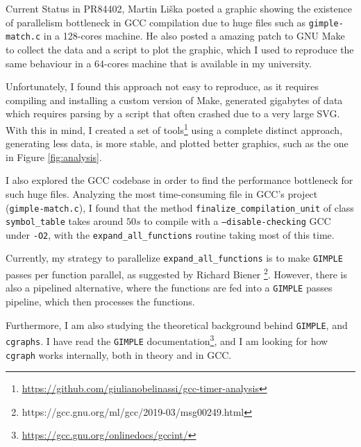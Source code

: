 \documentclass[12pt]{article}
\begin{document}
\begin{subsection}{Current Status}
in PR84402, Martin Liška posted a graphic showing the existence of
parallelism bottleneck in GCC compilation due to huge files such as
\texttt{gimple-match.c} in a 128-cores machine. He also posted a amazing patch to
GNU Make to collect the data and a script to plot the graphic, which I used
to reproduce the same behaviour in a 64-cores machine that is available in
my university.

Unfortunately, I found this approach not easy to reproduce, as
it requires compiling and installing a custom version of Make, generated
gigabytes of data which requires parsing by a script that often crashed due
to a very large SVG. With this in mind, I created a set of
tools\footnote{\url{https://github.com/giulianobelinassi/gcc-timer-analysis}}
using a complete distinct approach, generating less data, is more stable, and
plotted better graphics, such as the one in Figure \ref{fig:analysis}.

I also explored the GCC codebase in order to find the performance bottleneck for
such huge files. Analyzing the most time-consuming file in GCC's project
(\texttt{gimple-match.c}), I found that the method
\texttt{finalize\_compilation\_unit} of
class \texttt{symbol\_table} takes around $50s$ to compile with a
\texttt{--disable-checking} GCC under \texttt{-O2}, with the \texttt{expand\_all\_functions}
routine taking most of this time.

    Currently, my strategy to parallelize
\texttt{expand\_all\_functions} is to make \texttt{GIMPLE}
passes per function parallel, as suggested by Richard Biener
\footnote{https://gcc.gnu.org/ml/gcc/2019-03/msg00249.html}. However, there is also
a pipelined alternative, where the functions are fed into a
\texttt{GIMPLE} passes pipeline, which then processes the functions.


Furthermore, I am also studying the theoretical background behind \texttt{GIMPLE},
and \texttt{cgraphs}. I have read the \texttt{GIMPLE}
documentation\footnote{\url{https://gcc.gnu.org/onlinedocs/gccint/}}, and
I am looking for how \texttt{cgraph} works internally, both in theory and in
GCC.

\end{subsection}
\end{document}
